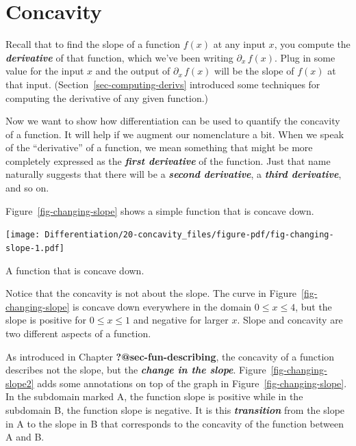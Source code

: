 \documentclass[
  letterpaper,
  DIV=11,
  numbers=noendperiod,
  oneside]{scrreprt}
\begin{document}
\hypertarget{sec-concavity-deriv}{%
\section{Concavity}\label{sec-concavity-deriv}}

Recall that to find the slope of a function \(f(x)\) at any input \(x\),
you compute the \textbf{\emph{derivative}} of that function, which we've
been writing \(\partial_x\,f(x)\). Plug in some value for the input
\(x\) and the output of \(\partial_x\, f(x)\) will be the slope of
\(f(x)\) at that input. (Section~\ref{sec-computing-derivs} introduced
some techniques for computing the derivative of any given function.)

Now we want to show how differentiation can be used to quantify the
concavity of a function. It will help if we augment our nomenclature a
bit. When we speak of the ``derivative'' of a function, we mean
something that might be more completely expressed as the
\textbf{\emph{first derivative}} of the function. Just that name
naturally suggests that there will be a \textbf{\emph{second
derivative}}, a \textbf{\emph{third derivative}}, and so on.

Figure~\ref{fig-changing-slope} shows a simple function that is concave
down.

\begin{marginfigure}

{\centering \texttt{[image: Differentiation/20-concavity\_files/figure-pdf/fig-changing-slope-1.pdf]}

}

\caption{\label{fig-changing-slope}A function that is concave down.}

\end{marginfigure}

Notice that the concavity is not about the slope. The curve in
Figure~\ref{fig-changing-slope} is concave down everywhere in the domain
\(0 \leq x \leq 4\), but the slope is positive for \(0 \leq x \leq 1\)
and negative for larger \(x\). Slope and concavity are two different
aspects of a function.

As introduced in Chapter \textbf{?@sec-fun-describing}, the concavity of
a function describes not the slope, but the \textbf{\emph{change in the
slope}}. Figure~\ref{fig-changing-slope2} adds some annotations on top
of the graph in Figure~\ref{fig-changing-slope}. In the subdomain marked
A, the function slope is positive while in the subdomain B, the function
slope is negative. It is this \textbf{\emph{transition}} from the slope
in A to the slope in B that corresponds to the concavity of the function
between A and B.
\end{document}
